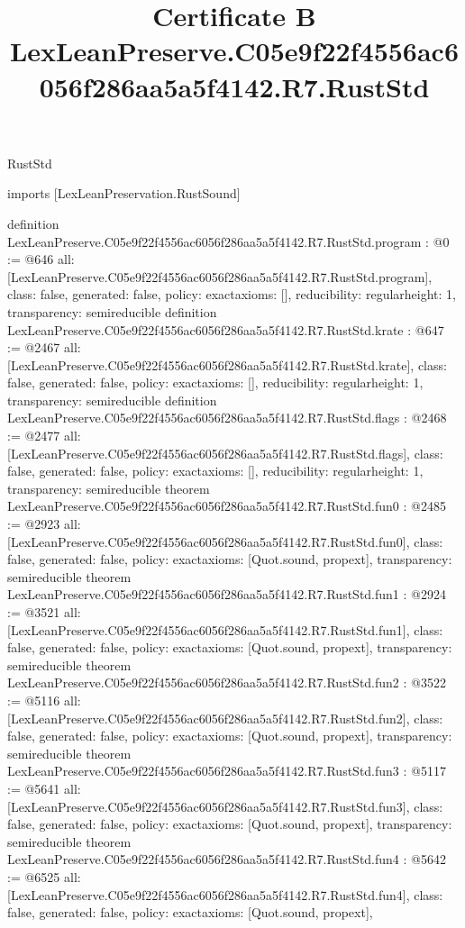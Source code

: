 \begin{lexlean}{RustStd}
\title{Certificate B LexLeanPreserve.C05e9f22f4556ac6056f286aa5a5f4142.R7.RustStd}
\begin{coremodule}
imports [LexLeanPreservation.RustSound]

definition LexLeanPreserve.C05e9f22f4556ac6056f286aa5a5f4142.R7.RustStd.program : @0 := @646 {
  all: [LexLeanPreserve.C05e9f22f4556ac6056f286aa5a5f4142.R7.RustStd.program],
  class: false,
  generated: false,
  policy: exact{axioms: []},
  reducibility: regular{height: 1},
  transparency: semireducible
}
definition LexLeanPreserve.C05e9f22f4556ac6056f286aa5a5f4142.R7.RustStd.krate : @647 := @2467 {
  all: [LexLeanPreserve.C05e9f22f4556ac6056f286aa5a5f4142.R7.RustStd.krate],
  class: false,
  generated: false,
  policy: exact{axioms: []},
  reducibility: regular{height: 1},
  transparency: semireducible
}
definition LexLeanPreserve.C05e9f22f4556ac6056f286aa5a5f4142.R7.RustStd.flags : @2468 := @2477 {
  all: [LexLeanPreserve.C05e9f22f4556ac6056f286aa5a5f4142.R7.RustStd.flags],
  class: false,
  generated: false,
  policy: exact{axioms: []},
  reducibility: regular{height: 1},
  transparency: semireducible
}
theorem LexLeanPreserve.C05e9f22f4556ac6056f286aa5a5f4142.R7.RustStd.fun0 : @2485 := @2923 {
  all: [LexLeanPreserve.C05e9f22f4556ac6056f286aa5a5f4142.R7.RustStd.fun0],
  class: false,
  generated: false,
  policy: exact{axioms: [Quot.sound, propext]},
  transparency: semireducible
}
theorem LexLeanPreserve.C05e9f22f4556ac6056f286aa5a5f4142.R7.RustStd.fun1 : @2924 := @3521 {
  all: [LexLeanPreserve.C05e9f22f4556ac6056f286aa5a5f4142.R7.RustStd.fun1],
  class: false,
  generated: false,
  policy: exact{axioms: [Quot.sound, propext]},
  transparency: semireducible
}
theorem LexLeanPreserve.C05e9f22f4556ac6056f286aa5a5f4142.R7.RustStd.fun2 : @3522 := @5116 {
  all: [LexLeanPreserve.C05e9f22f4556ac6056f286aa5a5f4142.R7.RustStd.fun2],
  class: false,
  generated: false,
  policy: exact{axioms: [Quot.sound, propext]},
  transparency: semireducible
}
theorem LexLeanPreserve.C05e9f22f4556ac6056f286aa5a5f4142.R7.RustStd.fun3 : @5117 := @5641 {
  all: [LexLeanPreserve.C05e9f22f4556ac6056f286aa5a5f4142.R7.RustStd.fun3],
  class: false,
  generated: false,
  policy: exact{axioms: [Quot.sound, propext]},
  transparency: semireducible
}
theorem LexLeanPreserve.C05e9f22f4556ac6056f286aa5a5f4142.R7.RustStd.fun4 : @5642 := @6525 {
  all: [LexLeanPreserve.C05e9f22f4556ac6056f286aa5a5f4142.R7.RustStd.fun4],
  class: false,
  generated: false,
  policy: exact{axioms: [Quot.sound, propext]},
}
\end{coremodule}
\end{lexlean}
